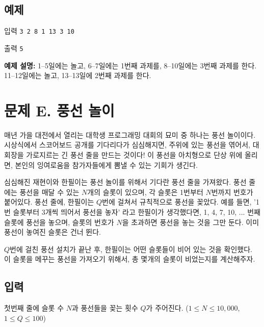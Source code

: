 \documentclass{article}
\begin{document}
\subsection{예제}
입력
\bgroup\obeylines
\texttt{3
	2 8
	1 13
	3 10 \newline}
\egroup

출력
\bgroup\obeylines
\texttt{5\newline}
\egroup

\textbf{예제 설명:} 1--5일에는 놀고, 6--7일에는 1번째 과제를, 8--10일에는 3번째 과제를 한다. 11--12일에는 놀고, 13--13일에 2번째 과제를 한다.

\newpage




\section{문제 E.  풍선 놀이}
매년 가을 대전에서 열리는 대학생 프로그래밍 대회의 묘미 중 하나는 풍선 놀이이다. 시상식에서 스코어보드 공개를 기다리다가 심심해지면, 주위에 있는 풍선을 엮어서, 대회장을 가로지르는 긴 풍선 줄을 만드는 것이다! 이 풍선을 아치형으로 단상 위에 올리면, 본인의 잉여로움을 참가자들에게 뽐낼 수 있는 기회가 생긴다. \newline

심심해진 재현이와 한필이는 풍선 놀이를 위해서 기다란 풍선 줄을 가져왔다. 풍선 줄에는 풍선을 매달 수 있는 $N$개의 슬롯이 있으며, 각 슬롯은 1번부터 $N$번까지 번호가 붙어있다. 풍선 줄에, 한필이는 $Q$번에 걸쳐서 규칙적으로 풍선을 꽂았다. 예를 들면, '1번 슬롯부터 3개씩 띄어서 풍선을 놓자' 라고 한필이가 생각했다면, 1, 4, 7, 10, ... 번째 슬롯에 풍선을 놓으며, 슬롯의 번호가 $N$을 초과하면 풍선을 놓는 것을 그만 둔다. 이미 풍선이 놓여진 슬롯은 건너 뛴다. \newline

$Q$번에 걸친 풍선 설치가 끝난 후, 한필이는 어떤 슬롯들이 비어 있는 것을 확인했다. 이 슬롯을 메꾸는 풍선을 가져오기 위해서, 총 몇개의 슬롯이 비었는지를 계산해주자. 

\subsection{입력}
첫번째 줄에 슬롯 수 $N$과 풍선들을 꽂는 횟수 $Q$가 주어진다. ($1 \leq N \leq 10,000$, $1 \leq Q \leq 100$) \newline
\end{document}
